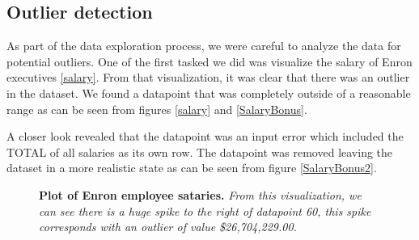 \documentclass[twoside,openright,titlepage,numbers=noenddot,headinclude,%
               footinclude=true,cleardoublepage=empty,abstractoff,BCOR=5mm,%
               paper=a4,fontsize=11pt,ngerman,american]{scrreprt}
\numberwithin{theorem}{chapter}
\numberwithin{definition}{chapter}
\numberwithin{algorithm}{chapter}
\numberwithin{figure}{chapter}
\numberwithin{table}{chapter}
\numberwithin{equation}{chapter}
\begin{document}
\clearpage


\subsection*{Outlier detection}
 As part of the data exploration process, we were careful to analyze the data for potential outliers. One of the first tasked we did was visualize the salary of Enron executives \ref{salary}. From that visualization, it was clear that there was an outlier in the dataset. We found a datapoint that was completely outside of a reasonable range as can be seen from figures \ref{salary} and \ref{SalaryBonus}. 

 A closer look revealed that the datapoint was an input error which included the TOTAL of all salaries as its own row. The datapoint was removed leaving the dataset in a more realistic state as can be seen from figure \ref{SalaryBonus2}.

\begin{figure}[!hbtp]
\centering
    
    \caption{\textbf{Plot of Enron employee sataries.}\textit{ From this visualization, we can see there is a huge spike to the right of datapoint 60, this spike corresponds with an outlier of value \$26,704,229.00.}}
\end{figure}
\end{document}
